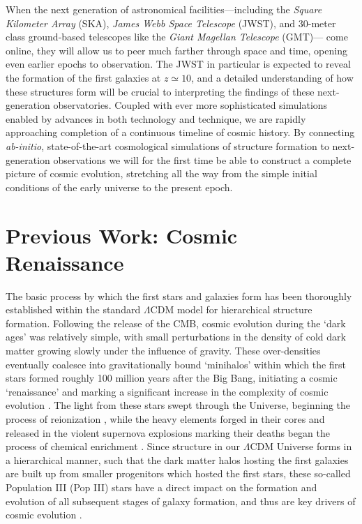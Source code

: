 \documentclass[../thesis.tex]{subfiles}
\begin{document}
When the next generation of astronomical facilities---including the \textit{Square Kilometer Array} (SKA), \textit{James Webb Space Telescope} (JWST), and 30-meter class ground-based telescopes like the \textit{Giant Magellan Telescope} (GMT)--- come online, they will allow us to peer much farther through space and time, opening even earlier epochs to observation.
The JWST in particular is expected to reveal the formation of the first galaxies at $z\simeq10$, and a detailed understanding of how these structures form will be crucial to interpreting the findings of these next-generation observatories.
Coupled with ever more sophisticated simulations enabled by advances in both technology and technique, we are rapidly approaching completion of a continuous timeline of cosmic history. 
By connecting \textit{ab-initio}, state-of-the-art cosmological simulations of structure formation to next-generation observations we will for the first time be able to construct a complete picture of cosmic evolution, stretching all the way from the simple initial conditions of the early universe to the present epoch.

\section{Previous Work: Cosmic Renaissance}
The basic process by which the first stars and galaxies form has been thoroughly established within the standard $\Lambda$CDM model for hierarchical structure formation.
Following the release of the CMB, cosmic evolution during the `dark ages' was relatively simple, with small perturbations in the density of cold dark matter 
growing slowly under the influence of gravity.
These over-densities eventually coalesce into gravitationally bound `minihalos' within which the first stars formed roughly 100 million years after the Big Bang, initiating a cosmic `renaissance' and marking a significant increase in the complexity of cosmic evolution \citep{BarkanaLoeb2001, Miralda-Escude2003, Brommetal2009, Loeb2010}.
The light from these stars swept through the Universe, beginning the process of reionization \citep[e.g.,][]{Meiksin2009}, while the heavy elements forged in their cores and released in the violent supernova explosions marking their deaths began the process of chemical enrichment \citep[e.g.,][]{KarlssonBrommHawthorn2013}.
Since structure in our $\Lambda$CDM Universe forms in a hierarchical manner, such that the dark matter halos hosting the first galaxies are built up from smaller progenitors which hosted the first stars, these so-called Population III (Pop III) stars have a direct impact on the formation and evolution of all subsequent stages of galaxy formation, and thus are key drivers of cosmic evolution \citep{Bromm2013}.  
\end{document}
